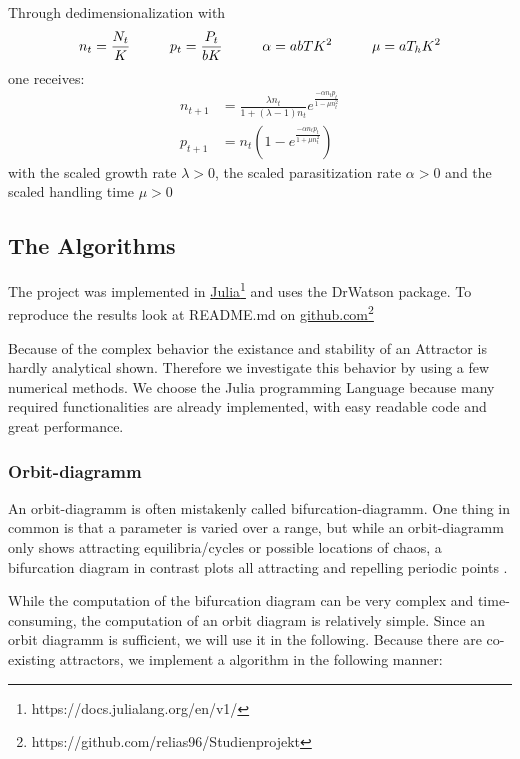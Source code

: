 \documentclass[a4paper,12pt, twoside]{article} %
\begin{document}
Through dedimensionalization with
\begin{equation}
  n_t = \frac{N_t}{K} \hspace*{10mm} p_t=\frac{P_t}{bK} \hspace*{10mm} \alpha = abTK^2 \hspace*{10mm} \mu = aT_h K^2
\end{equation}
one receives:
\begin{equation}
  \begin{split}
    n_{t+1} &= \frac{\lambda n_t}{1+(\lambda -1) n_t} e^{\frac{-\alpha n_t p_t}{1-\mu n_t^2}}\\
    p_{t+1} &= n_t \left( 1-e^{\frac{-\alpha n_t p_t}{1+\mu n_t^2}}\right)
  \end{split}
\end{equation}
with the scaled growth rate $\lambda > 0$, the scaled parasitization rate $\alpha > 0$ and 
the scaled handling time $\mu > 0$



\subsection{The Algorithms}
The project was implemented in \href{https://docs.julialang.org/en/v1/}{Julia}\footnote[1]{https://docs.julialang.org/en/v1/} and uses the DrWatson package.
To reproduce the results look at README.md on \href{https://github.com/relias96/Studienprojekt}{github.com}\footnote[2]{https://github.com/relias96/Studienprojekt}

Because of the complex behavior the existance and stability of an Attractor is hardly 
analytical shown. Therefore we investigate this behavior by using a few numerical methods. 
We choose the Julia programming Language because many required functionalities are already implemented, 
with easy readable code and great performance.\par

\subsubsection{Orbit-diagramm}
An orbit-diagramm is often mistakenly called bifurcation-diagramm. One thing in common is that a parameter is varied over a range, but while an orbit-diagramm only 
shows attracting equilibria/cycles or possible locations of chaos, a bifurcation diagram in contrast plots all attracting and repelling periodic points \autocite{bifurcation}.

While the computation of the bifurcation diagram can be very complex and time-consuming, the computation of an orbit diagram is relatively simple. Since an orbit diagramm 
is sufficient, we will use it in the following. Because there are co-existing attractors, we implement a algorithm in the following manner:
\end{document}
